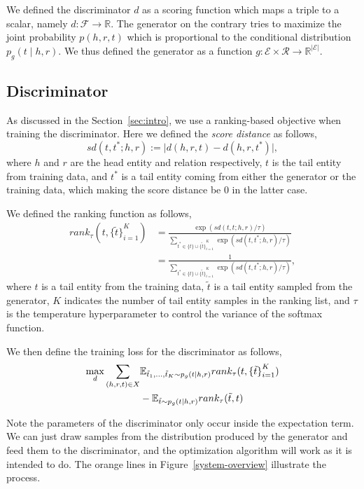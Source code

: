 \documentclass[twocolumn,a4paper,10pt,preprint,3p]{elsarticle}
\begin{document}
We defined the discriminator $d$ as a scoring function which maps a triple to a scalar, namely $d: \mathcal{F}\rightarrow \mathbb{R}$. The generator on the contrary tries to maximize the joint probability $p(h, r, t)$ which is proportional to the conditional distribution $p_g(t \mid h, r)$. We thus defined the generator as a function $g: \mathcal{E} \times \mathcal{R} \rightarrow \mathbb{R}^{\lvert \mathcal{E} \rvert}$.

\subsection{Discriminator}

As discussed in the Section~\ref{sec:intro}, we use a ranking-based objective when training the discriminator. Here we defined the \emph{score distance} as follows,
\[
    sd(t, t^*; h, r) := \lvert d(h, r, t) - d(h, r, t^*) \rvert,
\]
where $h$ and $r$ are the head entity and relation respectively, $t$ is the tail entity from training data, and $t^*$ is a tail entity coming from either the generator or the training data, which making the score distance be 0 in the latter case.

We defined the ranking function as follows,
\begin{align*}
    rank_\tau(t, {\{\tilde t \}}_{i=1}^K)
    &= \frac{\exp(sd(t, t; h, r) / \tau)}
        {\sum_{t^*\in \{t\} \cup {\{\tilde t \}}_{i=1}^K } \exp (sd(t, t^*; h, r) / \tau) } \\
    &= \frac{1}
        {\sum_{t^*\in \{t\} \cup {\{\tilde t \}}_{i=1}^K } \exp (sd(t, t^*; h, r) / \tau) },
\end{align*}
where $t$ is a tail entity from the training data, $\tilde t$ is a tail entity sampled from the generator, $K$ indicates the number of tail entity samples in the ranking list, and $\tau$ is the temperature hyperparameter to control the variance of the softmax function.

We then define the training loss for the discriminator as follows,
\begin{align}
    \max_d \sum_{(h, r, t)\in X}
        &\mathbb{E}_{\tilde t_1, \dots, \tilde t_K \sim p_g(t \mid h, r)}
            rank_\tau(t, {\{\tilde t \}}_{i=1}^K) \notag \\
        &- \mathbb{E}_{\tilde t \sim p_g(t \mid h, r)}
            rank_\tau(\tilde t, t) \label{eq:d_loss}
\end{align}


Note the parameters of the discriminator only occur inside the expectation term. We can just draw samples from the distribution produced by the generator and feed them to the discriminator, and the optimization algorithm will work as it is intended to do. The orange lines in Figure~\ref{system-overview} illustrate the process.
\end{document}

